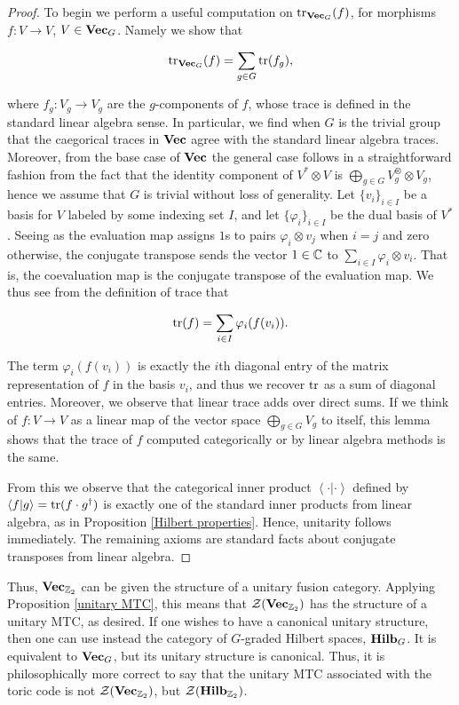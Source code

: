 \documentclass{article}
\theoremstyle{definition}
\numberwithin{figure}{section}
\begin{document}
\begin{proof} To begin we perform a useful computation on $\mathrm{tr}_{\bold{Vec}_G}(f)$, for morphisms $f:V\to V$, $V\in \bold{Vec}_G$. Namely we show that

$$\mathrm{tr}_{\bold{Vec}_G}(f)=\sum_{g\in G}\mathrm{tr}(f_g),$$

where $f_g: V_g\to V_g$ are the $g$-components of $f$, whose trace is defined in the standard linear algebra sense. In particular, we find when $G$ is the trivial group that the caegorical traces in $\bold{Vec}$ agree with the standard linear algebra traces. Moreover, from the base case of $\bold{Vec}$ the general case follows in a straightforward fashion from the fact that the identity component of $V^{*}\otimes V$ is $\bigoplus_{g\in G}V_g^{\otimes }\otimes V_g$, hence we assume that $G$ is trivial without loss of generality. Let $\{v_i\}_{i\in I}$ be a basis for $V$ labeled by some indexing set $I$, and let $\{\varphi_i\}_{i\in I}$ be the dual basis of $V^{*}$. Seeing as the evaluation map assigns $1$s to pairs $\varphi_i\otimes v_j$ when $i=j$ and zero otherwise, the conjugate transpose sends the vector $1\in \mathbb{C}$ to $\sum_{i\in I}\varphi_i\otimes v_i$. That is, the coevaluation map is the conjugate transpose of the evaluation map. We thus see from the definition of trace that

$$\mathrm{tr}(f)=\sum_{i\in I}\varphi_i(f(v_i)).$$

The term $\varphi_i(f(v_i))$ is exactly the $i$th diagonal entry of the matrix representation of $f$ in the basis $v_i$, and thus we recover $\mathrm{tr}$ as a sum of diagonal entries. Moreover, we observe that linear trace adds over direct sums. If we think of $f:V\to V$ as a linear map of the vector space $\bigoplus_{g\in G}V_g$ to itself, this lemma shows that the trace of $f$ computed categorically or by linear algebra methods is the same.

From this we observe that the categorical inner product $\left<\cdot | \cdot \right>$ defined by $\left<f|g\right>=\mathrm{tr}(f\cdot g^{\dagger})$ is exactly one of the standard inner products from linear algebra, as in Proposition \ref{Hilbert properties}. Hence, unitarity follows immediately. The remaining axioms are standard facts about conjugate transposes from linear algebra.
\end{proof}

Thus, $\bold{Vec}_{\mathbb{Z}_2}$ can be given the structure of a unitary fusion category. Applying Proposition \ref{unitary MTC}, this means that $\mathcal{Z}(\bold{Vec}_{\mathbb{Z}_2})$ has the structure of a unitary MTC, as desired. If one wishes to have a canonical unitary structure, then one can use instead the category of $G$-graded Hilbert spaces, $\bold{Hilb}_G$. It is equivalent to $\bold{Vec}_G$, but its unitary structure is canonical. Thus, it is philosophically more correct to say that the unitary MTC associated with the toric code is not $\mathcal{Z}(\bold{Vec}_{\mathbb{Z}_2})$, but $\mathcal{Z}(\bold{Hilb}_{\mathbb{Z}_2})$.
\end{document}

